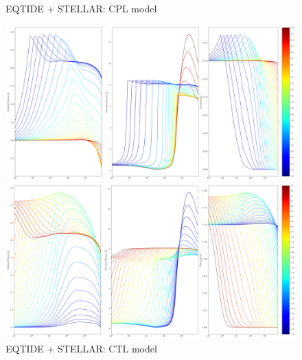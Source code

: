 \documentclass[]{aastex631}
\begin{document}
\begin{figure}[ht!]
\begin{center}
	\caption{EQTIDE + STELLAR: CPL model}
	\includegraphics[width=\linewidth]{../analysis/results_likelihood_1d/cpl_stellar_eqtide/plots/vary_q_evolution.png} 
	\caption{EQTIDE + STELLAR: CTL model}
	\includegraphics[width=\linewidth]{../analysis/results_likelihood_1d/ctl_stellar_eqtide/plots/vary_tau_evolution.png} 
\end{center}
\end{figure}
\end{document}
